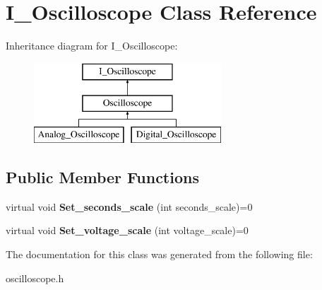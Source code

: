 \hypertarget{class_i___oscilloscope}{}\section{I\+\_\+\+Oscilloscope Class Reference}
\label{class_i___oscilloscope}
Inheritance diagram for I\+\_\+\+Oscilloscope\+:\begin{figure}[H]
\begin{center}
\leavevmode
\includegraphics[height=3.000000cm]{class_i___oscilloscope}
\end{center}
\end{figure}
\subsection*{Public Member Functions}
\begin{DoxyCompactItemize}
\item 
\mbox{\label{class_i___oscilloscope_a549b06dac27491259b19a5ac146ba573}} 
virtual void {\bfseries Set\+\_\+seconds\+\_\+scale} (int seconds\+\_\+scale)=0
\item 
\mbox{\label{class_i___oscilloscope_a8edbea9e72106c71f4a864140fe36772}} 
virtual void {\bfseries Set\+\_\+voltage\+\_\+scale} (int voltage\+\_\+scale)=0
\end{DoxyCompactItemize}


The documentation for this class was generated from the following file\+:\begin{DoxyCompactItemize}
\item 
oscilloscope.\+h\end{DoxyCompactItemize}
